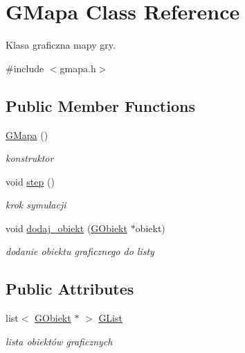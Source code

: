 \hypertarget{class_g_mapa}{}\section{G\+Mapa Class Reference}
\label{class_g_mapa}


Klasa graficzna mapy gry.  




{\ttfamily \#include $<$gmapa.\+h$>$}

\subsection*{Public Member Functions}
\begin{DoxyCompactItemize}
\item 
\mbox{\label{class_g_mapa_a02e8ab5c093b4921d3dd81bc0050653b}} 
\mbox{\hyperlink{class_g_mapa_a02e8ab5c093b4921d3dd81bc0050653b}{G\+Mapa}} ()
\begin{DoxyCompactList}\small\item\em konstruktor \end{DoxyCompactList}\item 
\mbox{\label{class_g_mapa_ac03b86b53afc749e8e79e86ffa1ef051}} 
void \mbox{\hyperlink{class_g_mapa_ac03b86b53afc749e8e79e86ffa1ef051}{step}} ()
\begin{DoxyCompactList}\small\item\em krok symulacji \end{DoxyCompactList}\item 
\mbox{\label{class_g_mapa_aaa0f06aa2a0011ce691474307287d755}} 
void \mbox{\hyperlink{class_g_mapa_aaa0f06aa2a0011ce691474307287d755}{dodaj\+\_\+obiekt}} (\mbox{\hyperlink{class_g_obiekt}{G\+Obiekt}} $\ast$obiekt)
\begin{DoxyCompactList}\small\item\em dodanie obiektu graficznego do listy \end{DoxyCompactList}\end{DoxyCompactItemize}
\subsection*{Public Attributes}
\begin{DoxyCompactItemize}
\item 
\mbox{\label{class_g_mapa_a9cf0a0549c5fd6aee849a5b879684c48}} 
list$<$ \mbox{\hyperlink{class_g_obiekt}{G\+Obiekt}} $\ast$ $>$ \mbox{\hyperlink{class_g_mapa_a9cf0a0549c5fd6aee849a5b879684c48}{G\+List}}
\begin{DoxyCompactList}\small\item\em lista obiektów graficznych \end{DoxyCompactList}\end{DoxyCompactItemize}



